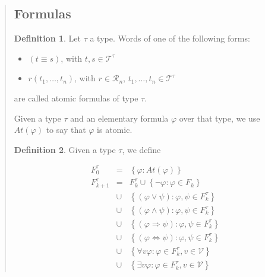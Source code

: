 \documentclass[a4paper, 12pt]{article}
\theoremstyle{definition}
\theoremstyle{definition}
\theoremstyle{definition}
\newtheorem{definition}{Definition}
\begin{document}
\begin{quote}
\subsection{Formulas}

\begin{definition}
    Let $\tau$ a type. Words of one of the following forms:

    \begin{itemize}
        \item $(t \equiv s)$, with $t, s \in \mathcal{T}^\tau$
        \item $r(t_1,\ldots, t_n)$, with $r \in \mathcal{R}_n$, $t_1, \ldots, t_n \in \mathcal{T}^\tau$
    \end{itemize}

    are called atomic formulas of type $\tau$.
\end{definition}

Given a type $\tau$ and an elementary formula $\varphi$ over that type, we use
$At(\varphi)$ to say that $\varphi$ is atomic.

\begin{definition}
    Given a type $\tau$, we define

    \begin{align*}
        &F_0^{\tau} &= &\left\{ \varphi : At(\varphi) \right\} \\ 
        &F_{k+1}^{\tau} &= &F_k^{\tau} \cup \left\{ \neg \varphi : \varphi \in F_{k} \right\}  \\ 
        &&\cup &\left\{ (\varphi \lor \psi) : \varphi, \psi \in F_k^\tau \right\} \\ 
        &&\cup &\left\{ (\varphi \land  \psi) : \varphi, \psi \in F_k^\tau \right\}  \\ 
        &&\cup &\left\{ (\varphi \Rightarrow \psi) : \varphi, \psi \in F_k^\tau \right\} \\ 
        &&\cup &\left\{ (\varphi \iff\psi) : \varphi, \psi \in F_k^\tau \right\} \\ 
        &&\cup &\left\{ \forall v \varphi : \varphi \in F_k^\tau, v \in \mathcal{V} \right\}  \\ 
        &&\cup & \left\{ \exists v \varphi : \varphi \in F_k^\tau, v \in \mathcal{V} \right\} 
    \end{align*}


\end{definition}
\end{quote}
\end{document}
